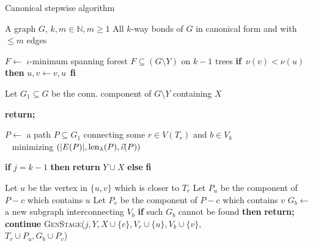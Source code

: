 \begin{algorithm}
	\caption{Canonical stepwise algorithm}
	\label{alg:final}
\begin{algorithmic}[1]
	\Require A graph $G$, $k,m \in \mathbb{N}, m \geq 1$
	\Ensure All $k$-way bonds of $G$ in canonical form and with $\leq m$ edges

	\State {}
	\State $F \leftarrow$ $\iota$-minimum spanning forest $F \subseteq (G \setminus Y )$ on $k-1$ trees
		\State \textbf{if} $ \, \nu(v) < \nu(u)$ \textbf{then}  $u,v \leftarrow v, u \,$ \textbf{fi}
		\State {}
	\EndFor
	\EndProcedure


	\State Let $G_1 \subseteq G$ be the conn. component of $G \setminus Y$ containing $X$

		\State \textbf{return;}
	\EndIf

	\State $P \leftarrow$ a path $P \subseteq G_1$ connecting some $r \in V(T_r)$ and $b \in V_b$ \\
	\qquad \quad \,\,\, minimizing $(\lvert E(P) \rvert, \operatorname{len}_\lambda(P), \vec{\iota}(P) )$

		\State \textbf{if} $j = k - 1$ \textbf{then} \textbf{return} $Y \cup X$ 
		\State \textbf{else}  \textbf{fi}

	\Else
			\State Let $u$ be the vertex in $\{u,v\}$ which is closer to $T_r$
			\State Let $P_u$ be the component of $P - c$ which contains $u$
			\State Let $P_v$ be the component of $P - c$ which contains $v$
				\State $G_b \leftarrow$ a new subgraph interconnecting $V_b$
				\State \textbf{if} such $G_b$ cannot be found \textbf{then} \textbf{return;}
			\EndIf
				\State \textbf{continue}
			\EndIf
			\State \textsc{GenStage}($j, Y, X \cup \{c\}, V_r \cup \{u\}, V_b \cup \{v\},$ \\
			\hskip 116.8pt $T_r \cup P_u, G_b \cup P_v$)
		\EndFor
	\EndIf

	\EndProcedure
\end{algorithmic}
\end{algorithm}


